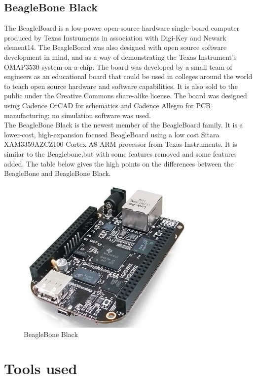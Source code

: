 \subsection{BeagleBone Black}
The BeagleBoard is a low-power open-source hardware single-board computer produced by Texas Instruments in association with Digi-Key and Newark element14. The BeagleBoard was also designed with open source software development in mind, and as a way of demonstrating the Texas Instrument's OMAP3530 system-on-a-chip. The board was developed by a small team of engineers as an educational board that could be used in colleges around the world to teach open source hardware and software capabilities. It is also sold to the public under the Creative Commons share-alike license. The board was designed using Cadence OrCAD for schematics and Cadence Allegro for PCB manufacturing; no simulation software was used.\\
The BeagleBone Black is the newest member of the BeagleBoard family. It is a lower-cost, high-expansion focused BeagleBoard using a low cost Sitara XAM3359AZCZ100 Cortex A8 ARM processor from Texas Instruments. It is similar to the Beaglebone,but with some features removed and some features added. The table below gives the high points on the differences between the BeagleBone and BeagleBone Black.
\begin{figure}[ht]
	\centering
	\includegraphics[width=3.5in, height=3in]{images/beaglebone_black.png}
	\caption{BeagleBone Black}
\end{figure}
\section{Tools used}
